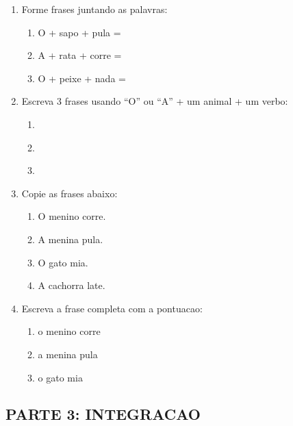 \begin{exercicio}
\begin{enumerate}[resume]
  \item Forme frases juntando as palavras:
  \begin{enumerate}[label=\alph*)]
    \item O + sapo + pula = \underline{\hspace{6cm}}
    \item A + rata + corre = \underline{\hspace{6cm}}
    \item O + peixe + nada = \underline{\hspace{6cm}}
  \end{enumerate}

  \item Escreva 3 frases usando ``O'' ou ``A'' + um animal + um verbo:
  \begin{enumerate}[label=\alph*)]
    \item \underline{\hspace{8cm}}
    \item \underline{\hspace{8cm}}
    \item \underline{\hspace{8cm}}
  \end{enumerate}

  \item Copie as frases abaixo:
  \begin{enumerate}[label=\alph*)]
    \item O menino corre.
    \item A menina pula.
    \item O gato mia.
    \item A cachorra late.
  \end{enumerate}

  \item Escreva a frase completa com a pontuacao:
  \begin{enumerate}[label=\alph*)]
    \item o menino corre \underline{\hspace{1cm}}
    \item a menina pula \underline{\hspace{1cm}}
    \item o gato mia \underline{\hspace{1cm}}
  \end{enumerate}
\end{enumerate}

\subsection*{PARTE 3: INTEGRACAO}


\end{exercicio}
